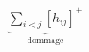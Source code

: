 \documentclass[preview]{standalone}
\begin{document}
\begin{align*}
\underbrace{\sum_{i<j}[h_{ij}]^+}_{\text{dommage}}
\end{align*}
\end{document}
